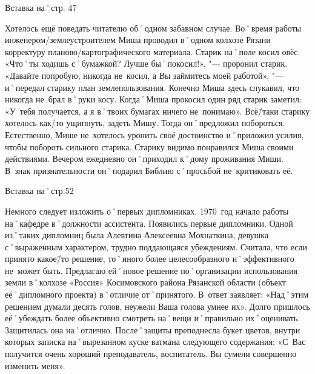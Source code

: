 Вставка на˚стр. 47

Хотелось ещё поведать читателю об˚одном забавном случае. Во˚время работы инженером\-/землеустроителем Миша проводил в˚одном колхозе Рязани корректуру планово\-/картографического материала. Старик на˚поле косил овёс. «Что˚ты ходишь с˚бумажкой? Лучше бы˚покосил!», "--- проронил старик. «Давайте попробую, никогда не~косил, а Вы займитесь моей работой», "--- и˚передал старику план землепользования. Конечно Миша здесь слукавил, что никогда не~брал в˚руки косу. Когда˚Миша прокосил один ряд старик заметил: «У~тебя получается, а я в˚твоих бумагах ничего не~понимаю». Всё\=/таки старику хотелось как\=/то ущипнуть, задеть Мишу. Тогда он˚предложил побороться. Естественно, Мише не~хотелось уронить своё достоинство и˚приложил усилия, чтобы побороть сильного старика. Старику видимо понравился Миша своими действиями. Вечером ежедневно он˚приходил к˚дому проживания Миши. В~знак признательности он˚подарил Библию с˚просьбой не~критиковать её. 

Вставка на˚стр.52

Немного следует изложить о˚первых дипломниках. 1970~год начало работы на˚кафедре в˚должности ассистента. Появились первые дипломники. Одной из˚таких дипломниц была Алевтина Алексеевна Мохнаткина, девушка с˚выраженным характером, трудно поддающаяся убеждениям. Считала, что если принято какое\=/то решение, то˚иного более целесообразного и˚эффективного не~может быть. Предлагаю ей˚новое решение по˚организации использования земли в˚колхозе «Россия» Косимовского района Рязанской области (объект её˚дипломного проекта) в˚отличие от˚принятого. В~ответ заявляет: «Над˚этим решением думали десять голов, неужели Ваша голова умнее их». Долго пришлось её˚убеждать более объективно смотреть на˚вещи и˚правильно их˚оценивать. Защитилась она на˚отлично. После˚защиты преподнесла букет цветов, внутри которых записка на˚вырезанном куске ватмана следующего содержания: «С~Вас получится очень хороший преподаватель, воспитатель. Вы сумели совершенно изменить меня».

